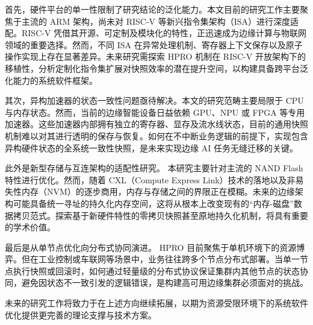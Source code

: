 首先，硬件平台的单一性限制了研究结论的泛化能力。本文目前的研究工作主要聚焦于主流的 ARM 架构，尚未对 RISC-V 等新兴指令集架构（ISA）进行深度适配。RISC-V 凭借其开源、可定制及模块化的特性，正迅速成为边缘计算与物联网领域的重要选择。然而，不同 ISA 在异常处理机制、寄存器上下文保存以及原子操作实现上存在显著差异。未来研究需探索 HPRO 机制在 RISC-V 开放架构下的移植性，分析定制化指令集扩展对快照效率的潜在提升空间，以构建具备跨平台泛化能力的系统软件框架。

其次，异构加速器的状态一致性问题亟待解决。本文的研究范畴主要局限于 CPU 与内存状态。然而，当前的边缘智能设备日益依赖 GPU、NPU 或 FPGA 等专用加速器。这些加速器内部拥有独立的寄存器、显存及流水线状态，目前的通用快照机制难以对其进行透明的保存与恢复。如何在不中断业务逻辑的前提下，实现包含异构硬件状态的全系统一致性快照，是未来实现边缘 AI 任务无缝迁移的关键。

此外是新型存储与互连架构的适配性研究。 本研究主要针对主流的 NAND Flash 特性进行优化。然而，随着 CXL（Compute Express Link）技术的落地以及非易失性内存（NVM）的逐步商用，内存与存储之间的界限正在模糊。未来的边缘架构可能具备统一寻址的持久化内存空间，这将从根本上改变现有的“内存-磁盘”数据拷贝范式。探索基于新硬件特性的零拷贝快照甚至原地持久化机制，将具有重要的学术价值。

最后是从单节点优化向分布式协同演进。 HPRO 目前聚焦于单机环境下的资源博弈。但在工业控制或车联网等场景中，业务往往跨多个节点分布式部署。当单一节点执行快照或回滚时，如何通过轻量级的分布式协议保证集群内其他节点的状态协同，避免因状态不一致引发的逻辑错误，是构建高可用边缘集群必须面对的挑战。

未来的研究工作将致力于在上述方向继续拓展，以期为资源受限环境下的系统软件优化提供更完善的理论支撑与技术方案。